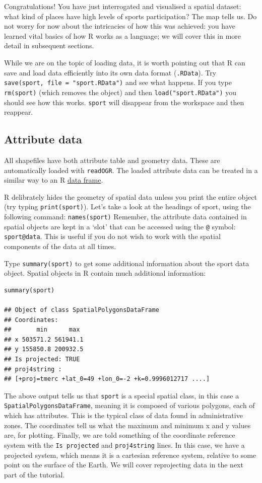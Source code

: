 \documentclass[]{article}
\begin{document}
Congratulations! You have just interrogated and visualised a spatial
dataset: what kind of places have high levels of sports participation?
The map tells us. Do not worry for now about the intricacies of how this
was achieved: you have learned vital basics of how R works as a
language; we will cover this in more detail in subsequent sections.

While we are on the topic of loading data, it is worth pointing out that
R can save and load data efficiently into its own data format
(\texttt{.RData}). Try \texttt{save(sport, file = "sport.RData")} and
see what happens. If you type \texttt{rm(sport)} (which removes the
object) and then \texttt{load("sport.RData")} you should see how this
works. \texttt{sport} will disappear from the workspace and then
reappear.

\subsection{Attribute data}

All shapefiles have both attribute table and geometry data. These are
automatically loaded with \texttt{readOGR}. The loaded attribute data
can be treated in a similar way to an R
\href{http://www.statmethods.net/input/datatypes.html}{data frame}.

R delibrately hides the geometry of spatial data unless you print the
entire object (try typing \texttt{print(sport)}). Let's take a look at
the headings of sport, using the following command:
\texttt{names(sport)} Remember, the attribute data contained in spatial
objects are kept in a `slot' that can be accessed using the \texttt{@}
symbol: \texttt{sport@data}. This is useful if you do not wish to work
with the spatial components of the data at all times.

Type \texttt{summary(sport)} to get some additional information about
the sport data object. Spatial objects in R contain much additional
information:

\begin{verbatim}
summary(sport)

## Object of class SpatialPolygonsDataFrame
## Coordinates:
##       min      max
## x 503571.2 561941.1
## y 155850.8 200932.5
## Is projected: TRUE 
## proj4string :
## [+proj=tmerc +lat_0=49 +lon_0=-2 +k=0.9996012717 ....]
\end{verbatim}
The above output tells us that \texttt{sport} is a special spatial
class, in this case a \texttt{SpatialPolygonsDataFrame}, meaning it is
composed of various polygons, each of which has attributes. This is the
typical class of data found in administrative zones. The coordinates
tell us what the maximum and minimum x and y values are, for plotting.
Finally, we are told something of the coordinate reference system with
the \texttt{Is projected} and \texttt{proj4string} lines. In this case,
we have a projected system, which means it is a cartesian reference
system, relative to some point on the surface of the Earth. We will
cover reprojecting data in the next part of the tutorial.
\end{document}
